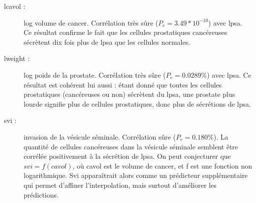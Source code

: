 \documentclass[a4paper, 12pt]{article}
\begin{document}
\begin{description}
\item[lcavol :] log volume de cancer. Corrélation très sûre ($P_e = 3.49*10^{-10}$) avec lpsa. Ce résultat confirme le fait que les cellules prostatiques cancéreuses sécrètent dix fois plus de lpsa que les cellules normales.
\item[lweight :] log poids de la prostate. Corrélation très sûre ($P_e = 0.0289 \%$) avec lpsa. Ce résultat est cohérent lui aussi : étant donné que toutes les cellules prostatiques (cancéreuses ou non) sécrètent du lpsa, une prostate plus lourde signifie plus de cellules prostatiques, donc plus de sécrétions de lpsa.
\item[svi :] invasion de la vésicule séminale. Corrélation sûre ($P_e = 0.180 \%$). La quantité de cellules cancéreuses dans la vésicule séminale semblent être corrélée positivement à la sécrétion de lpsa. On peut conjecturer que $svi = f(cavol)$, où cavol est le volume de cancer, et f est une fonction non logarithmique. Svi apparaîtrait alors comme un prédicteur supplémentaire qui permet d'affiner l'interpolation, mais surtout d'améliorer les prédictions.
\end{description}
\end{document}
